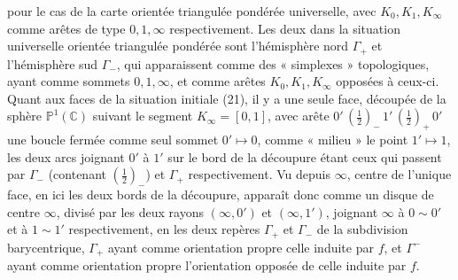 \documentclass[11pt,a4paper]{article}
\begin{document}
pour le cas de la carte orientée triangulée pondérée universelle, avec $K_0, K_1,
K_\infty$ comme arêtes de type $0, 1, \infty$ respectivement. Les deux
  dans la situation universelle orientée
triangulée pondérée sont l'hémisphère nord $\Gamma_+$ et l'hémisphère sud
$\Gamma_-$, qui apparaissent comme des « simplexes » topologiques, ayant comme
sommets $0, 1, \infty$, et comme arêtes $K_0, K_1, K_\infty$ opposées à ceux-ci.
Quant aux faces de la situation initiale (21), il y a une seule face, découpée de
la sphère $\mathbb{P}^1(\mathbb{C})$ suivant le segment $K_\infty = [0, 1]$, avec
 arête 
$0'\,(\tfrac12)_-\,1'\,(\tfrac12)_+\,0'$ \struck{\ill{}} 
une boucle fermée  comme seul sommet $0' \mapsto 0$, comme
« milieu » le point $1' \mapsto 1$, les deux arcs joignant $0'$ à $1'$ sur le bord
de la découpure étant ceux qui passent par $\Gamma_-$ (contenant
$(\tfrac12)_-$) et $\Gamma_+$ respectivement. Vu depuis $\infty$, centre de
l'unique face, en ici  les deux bords de la découpure,
 \struck{\ill{}} apparaît donc comme un disque de centre $\infty$,
divisé par les deux rayons  $(\infty, 0')$ et
$(\infty, 1')$, joignant $\infty$ à $0 \sim 0'$ et à $1 \sim 1'$
respectivement, en les deux repères $\Gamma_+$ et $\Gamma_-$ de la subdivision
barycentrique, $\Gamma_+$ ayant \struck{\ill{}} comme orientation propre celle
induite par $f$, \struck{\ill{}} et $\Gamma^-$ ayant comme orientation propre
l'orientation opposée de celle induite par $f$. 



\end{document}
